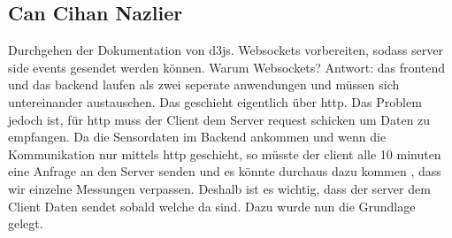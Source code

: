 \documentclass[]{article}
\begin{document}
\subsection{Can Cihan Nazlier}
Durchgehen der Dokumentation von d3js. Websockets vorbereiten, sodass server side events gesendet werden können. Warum Websockets?
Antwort: das frontend und das backend laufen als zwei seperate anwendungen und müssen sich untereinander austauschen. Das geschieht eigentlich über http. Das Problem jedoch ist,
für http muss der Client dem Server request schicken um Daten zu empfangen. Da die Sensordaten im Backend ankommen und wenn die Kommunikation nur mittels http geschieht, so müsste der client alle 10 minuten eine Anfrage an den Server senden und es könnte durchaus dazu kommen , dass wir einzelne Messungen verpassen. Deshalb ist es wichtig, dass der server dem Client Daten sendet sobald welche da sind. Dazu wurde nun die Grundlage gelegt. 


\printbibliography
\end{document}

